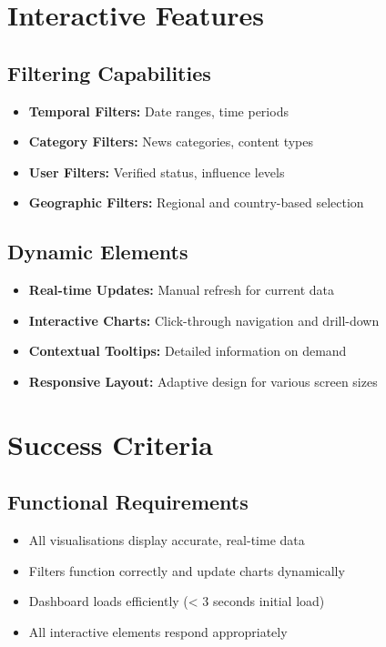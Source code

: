 \documentclass[11pt,a4paper]{article}
\begin{document}
\section{Interactive Features}

\subsection{Filtering Capabilities}
\begin{itemize}
    \item \textbf{Temporal Filters:} Date ranges, time periods
    \item \textbf{Category Filters:} News categories, content types
    \item \textbf{User Filters:} Verified status, influence levels
    \item \textbf{Geographic Filters:} Regional and country-based selection
\end{itemize}

\subsection{Dynamic Elements}
\begin{itemize}
    \item \textbf{Real-time Updates:} Manual refresh for current data
    \item \textbf{Interactive Charts:} Click-through navigation and drill-down
    \item \textbf{Contextual Tooltips:} Detailed information on demand
    \item \textbf{Responsive Layout:} Adaptive design for various screen sizes
\end{itemize}

\section{Success Criteria}

\subsection{Functional Requirements}
\begin{itemize}
    \item All visualisations display accurate, real-time data
    \item Filters function correctly and update charts dynamically
    \item Dashboard loads efficiently (< 3 seconds initial load)
    \item All interactive elements respond appropriately
\end{itemize}
\end{document}
